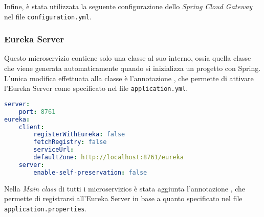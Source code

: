 

\noindent Infine, è stata utilizzata la seguente configurazione dello
\textit{Spring Cloud Gateway} nel file \texttt{configuration.yml}.




\subsubsection{Eureka Server}
Questo \gls{microservizio} contiene solo una classe al suo interno, ossia
quella
classe che viene generata automaticamente quando si inizializza un progetto con
Spring. L'unica modifica effettuata alla classe è l'annotazione
, che permette di  attivare l'\gls{Eureka Server}
come specificato nel file \texttt{application.yml}.

\begin{lstlisting}[language = yaml, caption = {File \texttt{application.yml} del microservizio \texttt{Eureka Server}}]
server:
    port: 8761
eureka:
    client:
        registerWithEureka: false 
        fetchRegistry: false
        serviceUrl:
        defaultZone: http://localhost:8761/eureka
    server:
        enable-self-preservation: false
\end{lstlisting}
\noindent Nella \textit{Main class} di tutti i \glspl{microservizio}  è stata
aggiunta l'annotazione , che permette di registrarsi
all'\gls{Eureka Server} in base a quanto specificato nel file
\texttt{application.properties}.\\

